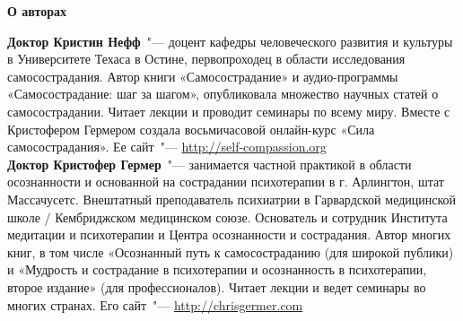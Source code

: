 
{\bf \Huge О авторах\\[2cm]}

{\bf Доктор Кристин Нефф}~"--- доцент кафедры человеческого развития и культуры в Университете Техаса в Остине, первопроходец в области исследования самосострадания. Автор книги «Самосострадание» и аудио-программы «Самосострадание: шаг за шагом», опубликовала множество научных статей о самосострадании. Читает лекции и проводит семинары по всему миру. Вместе с Кристофером Гермером создала восьмичасовой онлайн-курс «Сила самосострадания». Ее сайт~"--- \url{http://self-compassion.org}\\
	
{\bf Доктор Кристофер Гермер}~"--- занимается частной практикой в области осознанности и основанной на сострадании психотерапии в г. Арлингтон, штат Массачусетс. Внештатный преподаватель психиатрии в Гарвардской медицинской школе / Кембриджском медицинском союзе. Основатель и сотрудник Института медитации и психотерапии и Центра осознанности и сострадания. Автор многих книг, в том числе «Осознанный путь к самосостраданию (для широкой публики) и «Мудрость и сострадание в психотерапии и осознанность в психотерапии, второе издание» (для профессионалов). Читает лекции и ведет семинары во многих странах. Его сайт~"--- \url{http://chrisgermer.com}
	